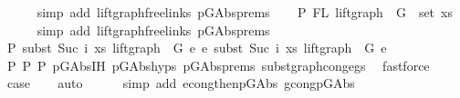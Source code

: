 \begin{isabellebody}
\ \ \ \ \isamarkupfalse%
\ {\isacharparenleft}{\kern0pt}simp\ add{\isacharcolon}{\kern0pt}\ lift{\isacharunderscore}{\kern0pt}graph{\isacharunderscore}{\kern0pt}freelinks\ p{\isacharunderscore}{\kern0pt}GAbs{\isachardot}{\kern0pt}prems{\isacharparenleft}{\kern0pt}{}{\isacharparenright}{\kern0pt}{\isacharparenright}{\kern0pt}\isanewline
\ \ \isamarkupfalse%
\ P{}{\isacharcolon}{\kern0pt}\ {\isachardoublequoteopen}FL\ {\isacharparenleft}{\kern0pt}lift{\isacharunderscore}{\kern0pt}graph\ {}\ G{}{\isacharparenright}{\kern0pt}\ {\isacharequal}{\kern0pt}\ set\ xs{\isachardoublequoteclose}\isanewline
\ \ \ \ \isamarkupfalse%
\ {\isacharparenleft}{\kern0pt}simp\ add{\isacharcolon}{\kern0pt}\ lift{\isacharunderscore}{\kern0pt}graph{\isacharunderscore}{\kern0pt}freelinks\ p{\isacharunderscore}{\kern0pt}GAbs{\isachardot}{\kern0pt}prems{\isacharparenleft}{\kern0pt}{}{\isacharparenright}{\kern0pt}{\isacharparenright}{\kern0pt}\isanewline
\isanewline
\ \ \isamarkupfalse%
\ P{}{\isacharcolon}{\kern0pt}\ {\isachardoublequoteopen}subst\ {\isacharparenleft}{\kern0pt}Suc\ i{\isacharparenright}{\kern0pt}\ xs\ {\isacharparenleft}{\kern0pt}lift{\isacharunderscore}{\kern0pt}graph\ {}\ G{}{\isacharparenright}{\kern0pt}\ e{}\ {\isasymsimeq}e\ subst\ {\isacharparenleft}{\kern0pt}Suc\ i{\isacharparenright}{\kern0pt}\ xs\ {\isacharparenleft}{\kern0pt}lift{\isacharunderscore}{\kern0pt}graph\ {}\ G{}{\isacharparenright}{\kern0pt}\ e{}{\isachardoublequoteclose}\isanewline
\ \ \ \ \isamarkupfalse%
\ P{}\ P{}\ P{}\ p{\isacharunderscore}{\kern0pt}GAbs{\isachardot}{\kern0pt}IH\ p{\isacharunderscore}{\kern0pt}GAbs{\isachardot}{\kern0pt}hyps\ p{\isacharunderscore}{\kern0pt}GAbs{\isachardot}{\kern0pt}prems{\isacharparenleft}{\kern0pt}{}{\isacharparenright}{\kern0pt}\ subst{\isacharunderscore}{\kern0pt}graph{\isacharunderscore}{\kern0pt}cong{\isacharunderscore}{\kern0pt}egs{}\ \isamarkupfalse%
\ fastforce\isanewline
\ \ \isamarkupfalse%
\ \isamarkupfalse%
\ {\isacharquery}{\kern0pt}case\isanewline
\ \ \isamarkupfalse%
\ auto\isanewline
\ \ \ \ \isamarkupfalse%
\ {\isacharparenleft}{\kern0pt}simp\ add{\isacharcolon}{\kern0pt}\ econg{\isacharunderscore}{\kern0pt}then{\isacharunderscore}{\kern0pt}p{\isacharunderscore}{\kern0pt}GAbs\ gcong{\isachardot}{\kern0pt}p{\isacharunderscore}{\kern0pt}GAbs{\isacharparenright}{\kern0pt}\isanewline

\end{isabellebody}
